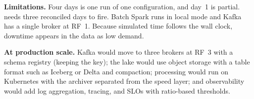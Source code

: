 \textbf{Limitations.} Four days is one run of one configuration, and
day~1 is partial.  needs three reconciled
days to fire. Batch Spark runs in local mode and Kafka has a single
broker at RF~1. Because simulated time follows the wall clock, downtime
appears in the data as low demand.

\textbf{At production scale.} \label{sec:production}
Kafka would move to three brokers at RF~3 with a
schema registry (keeping the  key); the lake would use
object storage with a table format such as Iceberg or Delta and
compaction; processing would run on Kubernetes with the archiver
separated from the speed layer; and observability would add log
aggregation, tracing, and SLOs with ratio-based thresholds.
